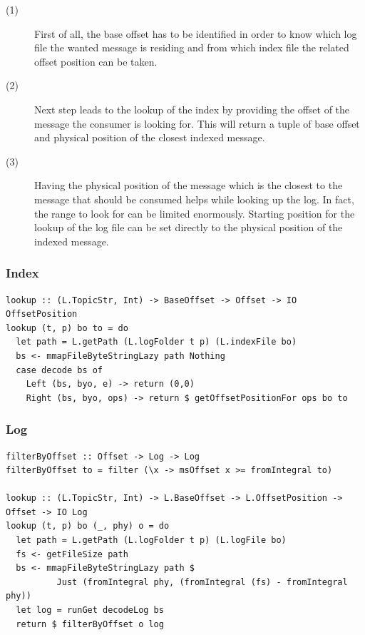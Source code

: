 \begin{description}
  \item[(1)]

    First of all, the base offset has to be identified in order to know which
    log file the wanted message is residing and from which index file the
    related offset position can be taken.

  \item[(2)]

    Next step leads to the lookup of the index by providing the offset of the
    message the consumer is looking for. This will return a tuple of base offset
    and physical position of the closest indexed message.

  \item[(3)]

    Having the physical position of the message which is the closest to the
    message that should be consumed helps while looking up the log. In fact, the
    range to look for can be limited enormously. Starting position for the
    lookup of the log file can be set directly to the physical position of the
    indexed message.

\end{description}

\subsubsection{Index}



\begin{lstlisting}
lookup :: (L.TopicStr, Int) -> BaseOffset -> Offset -> IO OffsetPosition
lookup (t, p) bo to = do
  let path = L.getPath (L.logFolder t p) (L.indexFile bo)
  bs <- mmapFileByteStringLazy path Nothing
  case decode bs of
    Left (bs, byo, e) -> return (0,0)
    Right (bs, byo, ops) -> return $ getOffsetPositionFor ops bo to
\end{lstlisting}


\subsubsection{Log}



\begin{lstlisting}
filterByOffset :: Offset -> Log -> Log
filterByOffset to = filter (\x -> msOffset x >= fromIntegral to)

lookup :: (L.TopicStr, Int) -> L.BaseOffset -> L.OffsetPosition -> Offset -> IO Log
lookup (t, p) bo (_, phy) o = do
  let path = L.getPath (L.logFolder t p) (L.logFile bo)
  fs <- getFileSize path
  bs <- mmapFileByteStringLazy path $ 
          Just (fromIntegral phy, (fromIntegral (fs) - fromIntegral phy))
  let log = runGet decodeLog bs
  return $ filterByOffset o log
\end{lstlisting}


